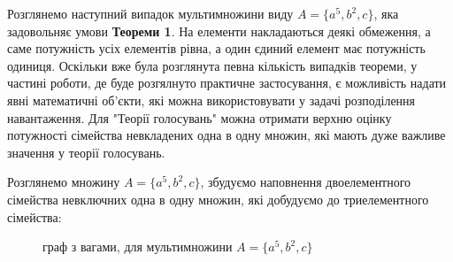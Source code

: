 Розглянемо наступний випадок мультимножини виду $A = \{a^5, b^2, c\}$, яка задовольняє умови {\bf Теореми 1}. На елементи накладаються деякі обмеження, а саме потужність усіх елементів рівна, а один єдиний елемент має потужність одиниця. Оскільки вже була розглянута певна кількість випадків теореми, у частині роботи, де буде розгялнуто практичне застосування, є можливість надати явні математичні об'єкти, які можна використовувати у задачі розподілення навантаження. Для "Теорії голосувань" можна отримати верхню оцінку потужності сімейства невкладених одна в одну множин, які мають дуже важливе значення у теорії голосувань.
\begin{example}

Розглянемо множину $ A = \{a^5, b^2, c\} $, збудуємо наповнення двоелементного сімейства невключних одна в одну множин, які добудуємо до триелементного сімейства:
\begin{figure}
\begin{center}
\end{center}
\caption{граф з вагами, для мультимножини  $ A = \{a^5, b^2, c\} $}
\end{figure}
\end{example}

